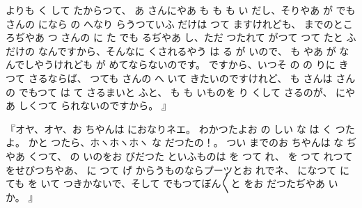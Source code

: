 よりも
く
して
たからつて、
あ
さんにやあ
も
も
も
い
だし、そりやあ
が
でも
さんの
になら
の
へなり
らうつていふ
だけは
つて
ますけれども、
までのところぢやあ
つ
さんの
に
た
でも
るぢやあ
し、ただ
つたれて
がつて
つて
たと
ふだけの
なんですから、そんなに
くされるやう
は
る
が
いので、
も
やあ
が
なんでしやうけれども
が
めてならないのです。
ですから、いつそ
の
の
りに
き
つて
さるならば、
つても
さんの
へ
いて
きたいのですけれど、
も
さんは
さんの
でもつて
は
て
さるまいと
ふと、
も
も
いものを
り
くして
さるのが、
にやあ
しくつて
られないのですから。
』

『オヤ、オヤ、お
ちやんは
におなりネエ。
わかつたよお
の
しい
な
は
く
つたよ。
かと
つたら、ホヽホヽホヽ
な
だつたの！。
つい
までのお
ちやんは
な
ぢやあ
くつて、
の
いのをお
びだつた
といふものは
を
つて
れ、
を
つて
れつて
をせびつちやあ、
に
つて
げ
からうものならプーツとお
れでネ、
になつて
に
ても
を
いて
つきかないで、そして
でもつてぼん〳〵と
をお
だつたぢやあ
いか。
』

